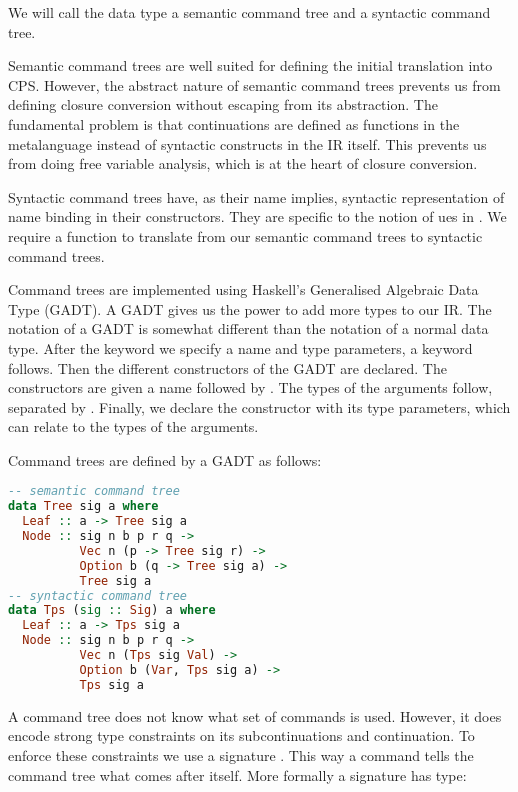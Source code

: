 We will call the data type  a semantic command tree and  a syntactic command tree.

Semantic command trees are well suited for defining the initial translation into CPS. However, the abstract nature of semantic command trees prevents us from defining closure conversion without escaping from its abstraction. The fundamental problem is that continuations are defined as functions in the metalanguage instead of syntactic constructs in the IR itself. This prevents us from doing free variable analysis, which is at the heart of closure conversion.

Syntactic command trees have, as their name implies, syntactic representation of name binding in their constructors. They are specific to the notion of ues in . We require a function to translate from our semantic command trees to syntactic command trees.

Command trees are implemented using Haskell's Generalised Algebraic Data Type (GADT). A GADT gives us the power to add more types to our IR. The notation of a GADT is somewhat different than the notation of a normal data type. After the  keyword we specify a name and type parameters, a  keyword follows. Then the different constructors of the GADT are declared. The constructors are given a name followed by \icode{::}. The types of the arguments follow, separated by \icode{->}. Finally, we declare the constructor with its type parameters, which can relate to the types of the arguments.

Command trees are defined by a GADT as follows:

\begin{lstlisting}[language=Haskell]
-- semantic command tree
data Tree sig a where
  Leaf :: a -> Tree sig a
  Node :: sig n b p r q ->
          Vec n (p -> Tree sig r) ->
          Option b (q -> Tree sig a) ->
          Tree sig a
-- syntactic command tree
data Tps (sig :: Sig) a where
  Leaf :: a -> Tps sig a
  Node :: sig n b p r q ->
          Vec n (Tps sig Val) ->
          Option b (Var, Tps sig a) ->
          Tps sig a
\end{lstlisting}

A command tree does not know what set of commands is used. However, it does encode strong type constraints on its subcontinuations and continuation. To enforce these constraints we use a signature . This way a command tells the command tree what comes after itself. More formally a signature has type:

